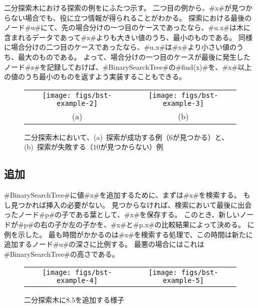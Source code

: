 二分探索木における探索の例をにふたつ示す。
二つ目の例から、#x#が見つからない場合でも、役に立つ情報が得られることがわかる。
探索における最後のノード#u#にて、先の場合分けの一つ目のケースであったなら、#u.x#は木に含まれるデータであって#x#よりも大きい値のうち、最小のものである。
同様に場合分けの二つ目のケースであったなら、#u.x#は#x#より小さい値のうち、最大のものである。
よって、場合分けの一つ目のケースが最後に発生したノード#z#を記録しておけば、#BinarySearchTree#の#find(x)#を、#x#以上の値のうち最小のものを返すよう実装することもできる。

\begin{figure}
  \begin{center}
    \begin{tabular}{cc}
    \texttt{[image: figs/bst-example-2]} &
    \texttt{[image: figs/bst-example-3]} \\
    (a) & (b)
    \end{tabular}
  \end{center}
  \caption{二分探索木において、(a)~探索が成功する例（$6$が見つかる）と、(b)~探索が失敗する（$10$が見つからない）例}
\end{figure}


\subsection{追加}

#BinarySearchTree#に値#x#を追加するために、まずは#x#を検索する。
もし見つかれば挿入の必要がない。
見つからなければ、検索において最後に出会ったノード#p#の子である葉として、#x#を保存する。
このとき、新しいノードが#p#の右の子か左の子かを、#x#と#p.x#の比較結果によって決める。
に例を示した。
最も時間がかかるのは#x#を検索する処理で、この時間は新たに追加するノード#u#の深さに比例する。 %
最悪の場合にはこれは#BinarySearchTree#の高さである。

\begin{figure}
  \begin{center}
    \begin{tabular}{cc}
    \texttt{[image: figs/bst-example-4]} &
    \texttt{[image: figs/bst-example-5]}
    \end{tabular}
  \end{center}
  \caption{二分探索木に$8.5$を追加する様子}
\end{figure}


